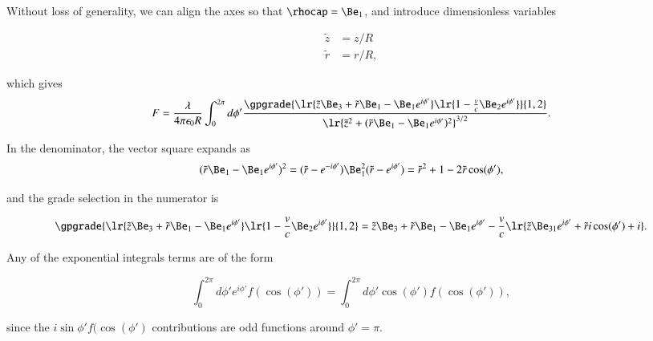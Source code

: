 Without loss of generality, we can align the axes so that \( \rhocap = \Be_1 \), and
introduce dimensionless variables

\begin{dmath}\label{eqn:ringField:100}
\begin{aligned}
\tilde{z} &= z/R \\
\tilde{r} &= r/R,
\end{aligned}
\end{dmath}

which gives
\begin{dmath}\label{eqn:ringField:120}
F
= \frac{\lambda}{4 \pi \epsilon_0 R} \int_0^{2\pi} d\phi' \frac{\gpgrade{ \lr{ \tilde{z} \Be_3 + \tilde{r} \Be_1 - \Be_1 e^{i\phi'} } \lr{ 1 - \frac{v}{c} \Be_2 e^{i\phi'} } }{1,2} } { \lr{ \tilde{z}^2 + (\tilde{r} \Be_1 - \Be_1 e^{i\phi'})^2}^{3/2} }.
\end{dmath}

In the denominator, the vector square expands as
\begin{dmath}\label{eqn:ringField:140}
(\tilde{r} \Be_1 - \Be_1 e^{i\phi'})^2
=
(\tilde{r} - e^{-i\phi'}) \Be_1^2 (\tilde{r} - e^{i\phi'})
=
\tilde{r}^2 + 1 - 2 \tilde{r} \cos(\phi'),
\end{dmath}

and the grade selection in the numerator is

\begin{dmath}\label{eqn:ringField:160}
\gpgrade{ \lr{ \tilde{z} \Be_3 + \tilde{r} \Be_1 - \Be_1 e^{i\phi'} } \lr{ 1 - \frac{v}{c} \Be_2 e^{i\phi'}}}{1,2}
=
\tilde{z} \Be_3 + \tilde{r} \Be_1 - \Be_1 e^{i\phi'}
-\frac{v}{c}\lr{ \tilde{z} \Be_{31} e^{i\phi'} + \tilde{r} i \cos(\phi') + i }.
\end{dmath}

Any of the exponential integrals terms
are of the form

\begin{dmath}\label{eqn:ringField:180}
\int_0^{2\pi} d\phi' e^{i\phi'} f(\cos(\phi')) = \int_0^{2\pi} d\phi' \cos(\phi') f(\cos(\phi')),
\end{dmath}

since
the \( i \sin\phi' f(\cos(\phi') \) contributions are odd functions around \( \phi' = \pi \).

